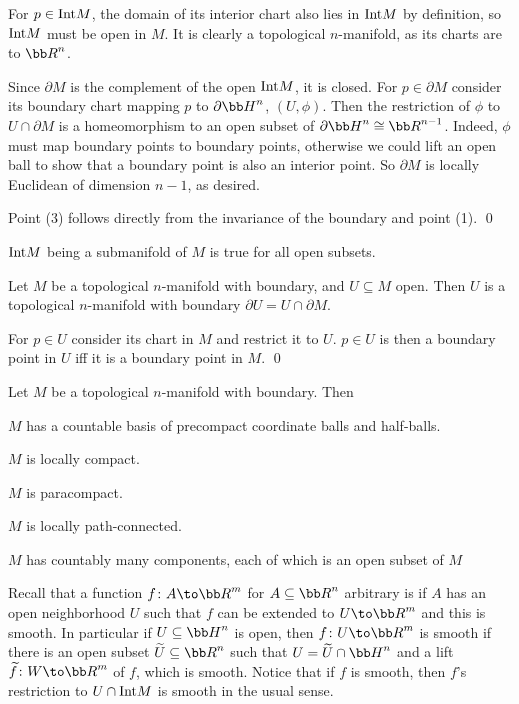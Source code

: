 \bproof

    For $p\in{\rm Int} M$, the domain of its interior chart also lies in ${\rm Int} M$ by definition, so ${\rm Int} M$ must be open in $M$.
    It is clearly a topological $n$-manifold, as its charts are to $\bR^n$.

    Since $\partial M$ is the complement of the open ${\rm Int} M$, it is closed.
    For $p\in\partial M$ consider its boundary chart mapping $p$ to $\partial\bH^n$, $(U,\phi)$.
    Then the restriction of $\phi$ to $U\cap\partial M$ is a homeomorphism to an open subset of $\partial\bH^n\cong\bR^{n-1}$.
    Indeed, $\phi$ must map boundary points to boundary points, otherwise we could lift an open ball to show that a boundary point is also
    an interior point.
    So $\partial M$ is locally Euclidean of dimension $n-1$, as desired.

    Point (3) follows directly from the invariance of the boundary and point (1).
    \qed

\eproof

${\rm Int} M$ being a submanifold of $M$ is true for all open subsets.

\bprop

    Let $M$ be a topological $n$-manifold with boundary, and $U\subseteq M$ open.
    Then $U$ is a topological $n$-manifold with boundary $\partial U=U\cap\partial M$.

\eprop

\bproof

    For $p\in U$ consider its chart in $M$ and restrict it to $U$.
    $p\in U$ is then a boundary point in $U$ iff it is a boundary point in $M$.
    \qed

\eproof

\bprop

    Let $M$ be a topological $n$-manifold with boundary.
    Then
    \benum
        \item $M$ has a countable basis of precompact coordinate balls and half-balls.
        \item $M$ is locally compact.
        \item $M$ is paracompact.
        \item $M$ is locally path-connected.
        \item $M$ has countably many components, each of which is an open subset of $M$
    \eenum

\eprop

Recall that a function $f\colon A\to\bR^m$ for $A\subseteq\bR^n$ arbitrary is  if $A$ has an open neighborhood $U$ such that
$f$ can be extended to $U\to\bR^m$ and this is smooth.
In particular if $U\subseteq\bH^n$ is open, then $f\colon U\to\bR^m$ is smooth if there is an open subset $\tilde U\subseteq\bR^n$ such that
$U=\tilde U\cap\bH^n$ and a lift $\tilde f\colon W\to\bR^m$ of $f$, which is smooth.
Notice that if $f$ is smooth, then $f$'s restriction to $U\cap{\rm Int} M$ is smooth in the usual sense.

